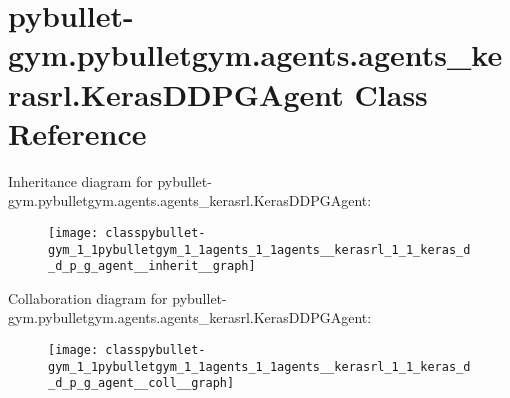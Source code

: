 \hypertarget{classpybullet-gym_1_1pybulletgym_1_1agents_1_1agents__kerasrl_1_1_keras_d_d_p_g_agent}{}\section{pybullet-\/gym.pybulletgym.\+agents.\+agents\+\_\+kerasrl.\+Keras\+D\+D\+P\+G\+Agent Class Reference}
\label{classpybullet-gym_1_1pybulletgym_1_1agents_1_1agents__kerasrl_1_1_keras_d_d_p_g_agent}


Inheritance diagram for pybullet-\/gym.pybulletgym.\+agents.\+agents\+\_\+kerasrl.\+Keras\+D\+D\+P\+G\+Agent\+:
\nopagebreak
\begin{figure}[H]
\begin{center}
\leavevmode
\texttt{[image: classpybullet-gym\_1\_1pybulletgym\_1\_1agents\_1\_1agents\_\_kerasrl\_1\_1\_keras\_d\_d\_p\_g\_agent\_\_inherit\_\_graph]}
\end{center}
\end{figure}


Collaboration diagram for pybullet-\/gym.pybulletgym.\+agents.\+agents\+\_\+kerasrl.\+Keras\+D\+D\+P\+G\+Agent\+:
\nopagebreak
\begin{figure}[H]
\begin{center}
\leavevmode
\texttt{[image: classpybullet-gym\_1\_1pybulletgym\_1\_1agents\_1\_1agents\_\_kerasrl\_1\_1\_keras\_d\_d\_p\_g\_agent\_\_coll\_\_graph]}
\end{center}
\end{figure}
